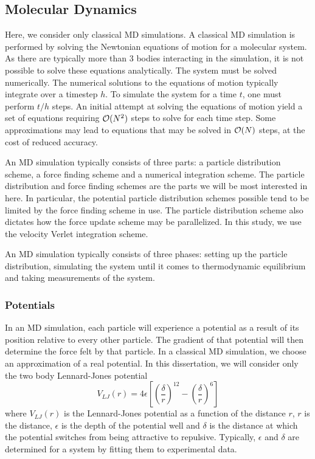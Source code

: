 %
%
\subsection{Molecular Dynamics}


Here, we consider only classical MD simulations.
%
A classical MD simulation is performed by
solving the Newtonian equations of motion for a molecular system.
%
As there are typically more than 3 bodies interacting in the simulation,
it is not possible to solve these equations analytically.
%
The system must be solved numerically.
%
The numerical solutions to the equations of motion
typically integrate over a timestep $h$.
%
To simulate the system for a time $t$, one must perform $t/h$ steps.
%
An initial attempt at solving the equations of motion yield a set of equations
requiring $\mathcal{O}{(N^2)}$ steps to solve for each time step.
%
Some approximations may lead to equations that may be solved in $\mathcal{O}{(N)}$
steps, at the cost of reduced accuracy.



An MD simulation typically consists of three parts:
a particle distribution scheme,
a force finding scheme and
a numerical integration scheme.
%
The particle distribution and force finding schemes are
the parts we will be most interested in here.
%
In particular, the potential particle distribution schemes possible
tend to be limited by the force finding scheme in use.
%
The particle distribution scheme also dictates how the force update scheme
may be parallelized.
%
In this study, we use the velocity Verlet integration scheme.

An MD simulation typically consists of three phases:
setting up the particle distribution,
simulating the system until it comes to thermodynamic equilibrium and
taking measurements of the system.


%
%
\subsubsection{Potentials}

In an MD simulation, each particle will experience a potential as a result
of its position relative to every other particle.
%
The gradient of that potential will then determine the force felt by
that particle.
%
In a classical MD simulation, we choose an approximation of a real
potential.
%
In this dissertation, we will consider only the two body Lennard-Jones potential
\begin{equation}
    V_{LJ}(r) = 4\epsilon{} \left[
        \left( \frac{\delta}{r} \right)^{12}
        - \left( \frac{\delta}{r} \right)^{6}
    \right]
\end  {equation}
where $V_{LJ}(r)$ is the Lennard-Jones potential as
a function of the distance $r$,
$r$ is the distance,
$\epsilon$ is the depth of the potential well and
$\delta$ is the distance at which the potential switches from being
attractive to repulsive.
%
Typically, $\epsilon$ and $\delta$ are determined for a system
by fitting them to experimental data.

